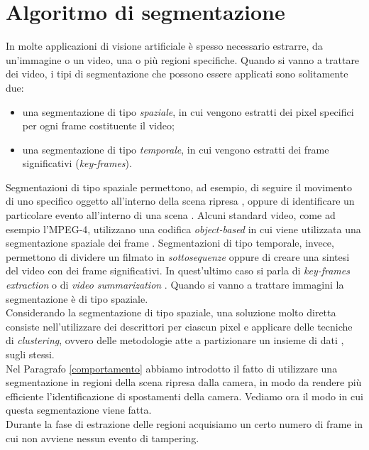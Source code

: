 \section{Algoritmo di segmentazione}
\label{segmentazione}
In molte applicazioni di visione artificiale \`e spesso necessario estrarre, da un'immagine o un video, una o pi\`u regioni specifiche. Quando si vanno a trattare dei video, i tipi di segmentazione che possono essere applicati sono solitamente due:
\begin{itemize}      
	\item una segmentazione di tipo \textit{spaziale}, in cui vengono estratti dei pixel specifici per ogni frame costituente il video;
	\item una segmentazione di tipo \textit{temporale}, in cui vengono estratti dei frame significativi (\textit{key-frames}).
\end{itemize}
Segmentazioni di tipo spaziale permettono, ad esempio, di seguire il movimento di uno specifico oggetto all'interno della scena ripresa \cite{kim2003efficient,kottke1994motion}, oppure di identificare un particolare evento all'interno di una scena \cite{ke2007event}.
Alcuni standard video, come ad esempio l'MPEG-4, utilizzano una codifica \textit{object-based} in cui viene utilizzata una segmentazione spaziale dei frame \cite{deng2001unsupervised}. 
Segmentazioni di tipo temporale, invece, permettono di dividere un filmato in \textit{sottosequenze} oppure di creare una sintesi del video con dei frame significativi. In quest'ultimo caso si parla di \textit{key-frames extraction} o di \textit{video summarization} \cite{gong2000video,jiang2009hierarchical,sentinelli2014live,wolf1996key}. Quando si vanno a trattare immagini la segmentazione \`e di tipo spaziale.\\
Considerando la segmentazione di tipo spaziale, una soluzione molto diretta consiste nell'utilizzare dei descrittori per ciascun pixel e applicare delle tecniche di \textit{clustering}, ovvero delle metodologie atte a partizionare un insieme di dati \cite{han2006data}, sugli stessi. \\
Nel Paragrafo \ref{comportamento} abbiamo introdotto il fatto di utilizzare una segmentazione in regioni della scena ripresa dalla camera, in modo da rendere pi\`u efficiente l'identificazione di spostamenti della camera.
Vediamo ora il modo in cui questa segmentazione viene fatta.\\
Durante la fase di estrazione delle regioni acquisiamo un certo numero di frame in cui non avviene nessun evento di tampering.
